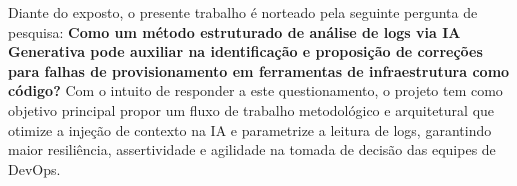Diante do exposto, o presente trabalho é norteado pela seguinte pergunta de pesquisa: \textbf{Como um método estruturado de análise de logs via IA Generativa pode auxiliar na identificação e proposição de correções para falhas de provisionamento em ferramentas de infraestrutura como código?} Com o intuito de responder a este questionamento, o projeto tem como objetivo principal propor um fluxo de trabalho metodológico e arquitetural que otimize a injeção de contexto na IA e parametrize a leitura de logs, garantindo maior resiliência, assertividade e agilidade na tomada de decisão das equipes de DevOps.
